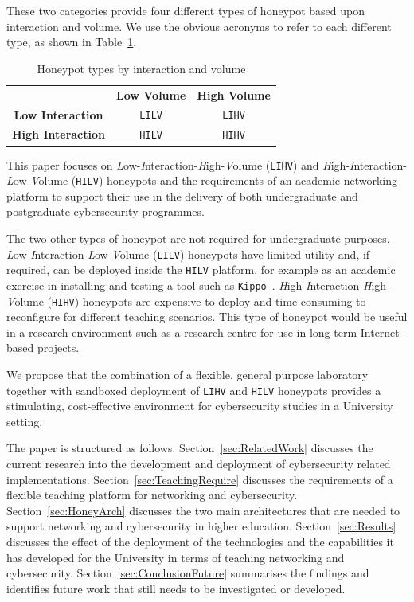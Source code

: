 \documentclass{ieeeaccess}
\begin{document}
These two categories provide four different types of honeypot based upon
interaction and volume. We use the obvious acronyms to refer to each different
type, as shown in Table~\ref{table:HoneypotTypes}.

\begin{table}[ht]
\caption{Honeypot types by interaction and volume\label{table:HoneypotTypes}}
\begin{center}
\setlength\doublerulesep{0.5pt}
\begin{tabular}{| c || c| c |}
\hline
 & \textbf{Low Volume} & \textbf{High Volume} \\
\hhline{|=||=|=|}
\textbf{Low Interaction} & \texttt{LILV} & \texttt{LIHV} \\
\hline
\textbf{High Interaction} & \texttt{HILV} & \texttt{HIHV} \\
\hline
\end{tabular}
\end{center}
\end{table}

This paper focuses on \emph{L}ow-\emph{I}nteraction-\emph{H}igh-\emph{V}olume
(\texttt{LIHV}) and \emph{H}igh-\emph{I}nteraction-\emph{L}ow-\emph{V}olume
(\texttt{HILV}) honeypots and the requirements of an academic networking
platform to support their use in the delivery of both undergraduate and
postgraduate cybersecurity programmes.

The two other types of honeypot are not required for undergraduate purposes.
\emph{L}ow-\emph{I}nteraction-\emph{L}ow-\emph{V}olume (\texttt{LILV})
honeypots have limited utility and, if required,  can be deployed inside the
\texttt{HILV} platform, for example as an academic exercise in installing and
testing a tool such as \texttt{Kippo}~\cite{SH:15}.
\emph{H}igh-\emph{I}nteraction-\emph{H}igh-\emph{V}olume (\texttt{HIHV})
honeypots are expensive to deploy and time-consuming to reconfigure for
different teaching scenarios. This type of honeypot would be useful in a
research environment such as a research centre for use in long term
Internet-based projects. 

We propose that the combination of a flexible, general purpose laboratory
together with sandboxed deployment of \texttt{LIHV} and \texttt{HILV} honeypots provides 
a stimulating, cost-effective environment for cybersecurity studies
in a University setting.

The paper is structured as follows: Section~\ref{sec:RelatedWork} discusses the current research into the development and deployment of cybersecurity related implementations. Section~\ref{sec:TeachingRequire} discusses the requirements of a flexible teaching platform for networking and cybersecurity. 
Section~\ref{sec:HoneyArch} discusses the two main architectures that are needed to support networking and cybersecurity in higher education. Section~\ref{sec:Results} discusses the effect of the deployment of the technologies and the capabilities it has developed for the University in terms of teaching networking and cybersecurity. Section~\ref{sec:ConclusionFuture} summarises the findings and identifies future work that still needs to be investigated or developed.
\end{document}

